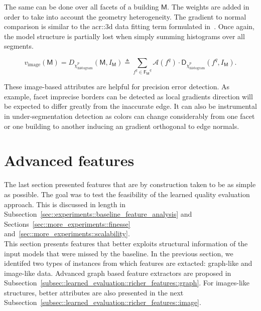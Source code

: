        The same can be done over all facets of a building $\mathsf{M}$.
        The weights are added in order to take into account the geometry heterogeneity.
        The gradient to normal comparison is similar to the \gls{acr::3d} data fitting term formulated in~\parencite{li2016manhattan}.
        Once again, the model structure is partially lost when simply summing histograms over all segments.

        \begin{equation}
            \label{eq::corr_bul}
            v_{\text{image}}\left(\mathsf{M}\right) = D_{\chi^p_{\operatorname{histogram}}}\left(\mathsf{M}, I_{\mathsf{M}}\right) \triangleq \sum_{f^q \in \mathsf{F_M}^q} \mathscr{A}\left(f^q\right) \cdot \mathsf{D}_{\chi^p_{\operatorname{histogram}}}(f^q, I_{\mathsf{M}}).
        \end{equation}
        
        These image-based attributes are helpful for precision error detection.
        As example, facet imprecise borders can be detected as local gradients direction will be expected to differ greatly from the inaccurate edge.
        It can also be instrumental in under-segmentation detection as colors can change considerably from one facet or one building to another inducing an gradient orthogonal to edge normals.

\section{Advanced features}
    \label{sec::learned_evaluation::richer_features}
    The last section presented features that are by construction taken to be as simple as possible.
    The goal was to test the feasibility of the learned quality evaluation approach.
    This is discussed in length in Subsection~\ref{sec::experiments::baseline_feature_analysis} and Sections~\ref{sec::more_experiments::finesse} and~\ref{sec::more_experiments::scalability}.\\

    This section presents features that better exploits structural information of the input models that were missed by the baseline.
    In the previous section, we identifed two types of instances from which features are extacted: graph-like and image-like data.
    Advanced graph based feature extractors are proposed in Subsection~\ref{subsec::learned_evaluation::richer_features::graph}.
    For images-like structures, better attributes are also presented in the next Subsection~\ref{subsec::learned_evaluation::richer_features::image}.

